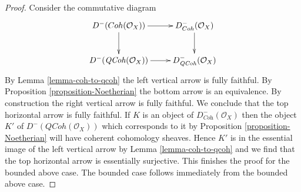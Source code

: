 \documentclass{stacks-project}
\theoremstyle{plain}
\theoremstyle{definition}
\theoremstyle{remark}
\numberwithin{equation}{subsection}
\def\QCoh{\mathit{QCoh}}
\begin{document}
\begin{proof}
Consider the commutative diagram
$$
\xymatrix{
D^-(\textit{Coh}(\mathcal{O}_X)) \ar[r] \ar[d] &
D^-_{\textit{Coh}}(\mathcal{O}_X) \ar[d] \\
D^-(\QCoh(\mathcal{O}_X)) \ar[r] &
D^-_\QCoh(\mathcal{O}_X)
}
$$
By Lemma \ref{lemma-coh-to-qcoh} the left vertical arrow is fully faithful.
By Proposition \ref{proposition-Noetherian} the bottom arrow is an equivalence.
By construction the right vertical arrow is fully faithful.
We conclude that the top horizontal arrow is fully faithful.
If $K$ is an object of $D^-_{\textit{Coh}}(\mathcal{O}_X)$
then the object $K'$ of $D^-(\QCoh(\mathcal{O}_X))$ which corresponds
to it by Proposition \ref{proposition-Noetherian} will have
coherent cohomology sheaves. Hence $K'$ is in the essential
image of the left vertical arrow by Lemma \ref{lemma-coh-to-qcoh}
and we find that the top horizontal arrow is essentially surjective.
This finishes the proof for the bounded above case. The bounded
case follows immediately from the bounded above case.
\end{proof}
\end{document}
